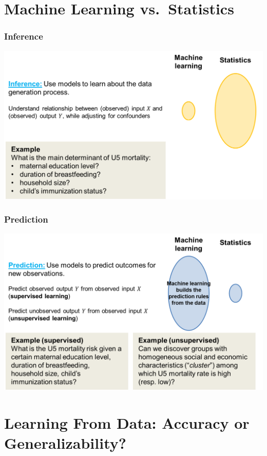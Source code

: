 \documentclass[
  letterpaper,
  DIV=11,
  numbers=noendperiod,
  oneside]{scrreprt}
\begin{document}
\hypertarget{machine-learning-vs.-statistics}{%
\section{Machine Learning
vs.~Statistics}\label{machine-learning-vs.-statistics}}

\hypertarget{inference}{%
\subsubsection{Inference}\label{inference}}

\includegraphics{./images/paste-C70B4C10.png}

\hypertarget{prediction}{%
\subsubsection{Prediction}\label{prediction}}

\includegraphics{./images/paste-2C4E6936.png}

\hypertarget{learning-from-data-accuracy-or-generalizability}{%
\section{Learning From Data: Accuracy or
Generalizability?}\label{learning-from-data-accuracy-or-generalizability}}
\end{document}
